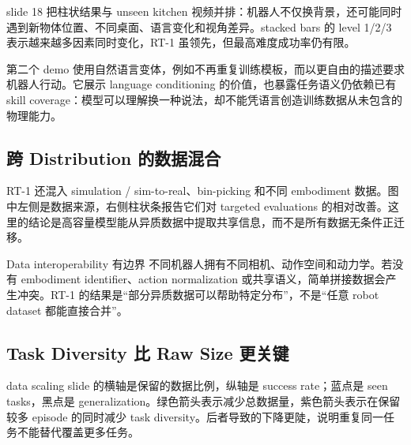 slide 18 把柱状结果与 unseen kitchen 视频并排：机器人不仅换背景，还可能同时遇到新物体位置、不同桌面、语言变化和视角差异。stacked bars 的 level 1/2/3 表示越来越多因素同时变化，RT-1 虽领先，但最高难度成功率仍有限。


第二个 demo 使用自然语言变体，例如不再重复训练模板，而以更自由的描述要求机器人行动。它展示 language conditioning 的价值，也暴露任务语义仍依赖已有 skill coverage：模型可以理解换一种说法，却不能凭语言创造训练数据从未包含的物理能力。



\subsection{跨 Distribution 的数据混合}

RT-1 还混入 simulation / sim-to-real、bin-picking 和不同 embodiment 数据。图中左侧是数据来源，右侧柱状条报告它们对 targeted evaluations 的相对改善。这里的结论是高容量模型能从异质数据中提取共享信息，而不是所有数据无条件正迁移。


\begin{warningbox}{Data interoperability 有边界}
不同机器人拥有不同相机、动作空间和动力学。若没有 embodiment identifier、action normalization 或共享语义，简单拼接数据会产生冲突。RT-1 的结果是“部分异质数据可以帮助特定分布”，不是“任意 robot dataset 都能直接合并”。
\end{warningbox}

\subsection{Task Diversity 比 Raw Size 更关键}

data scaling slide 的横轴是保留的数据比例，纵轴是 success rate；蓝点是 seen tasks，黑点是 generalization。绿色箭头表示减少总数据量，紫色箭头表示在保留较多 episode 的同时减少 task diversity。后者导致的下降更陡，说明重复同一任务不能替代覆盖更多任务。

